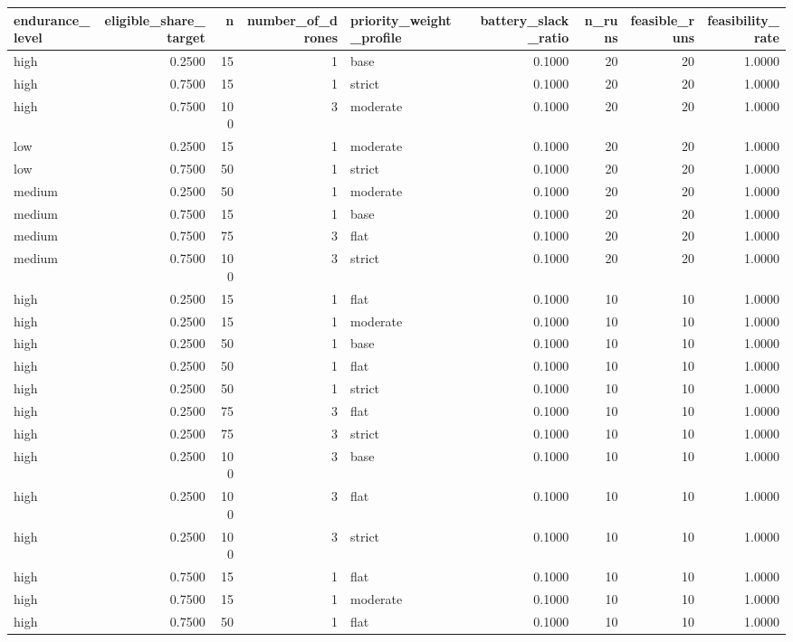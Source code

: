 \begin{tabular}{lrrrlrrrr}
\toprule
endurance_level & eligible_share_target & n & number_of_drones & priority_weight_profile & battery_slack_ratio & n_runs & feasible_runs & feasibility_rate \\
\midrule
high & 0.2500 & 15 & 1 & base & 0.1000 & 20 & 20 & 1.0000 \\
high & 0.7500 & 15 & 1 & strict & 0.1000 & 20 & 20 & 1.0000 \\
high & 0.7500 & 100 & 3 & moderate & 0.1000 & 20 & 20 & 1.0000 \\
low & 0.2500 & 15 & 1 & moderate & 0.1000 & 20 & 20 & 1.0000 \\
low & 0.7500 & 50 & 1 & strict & 0.1000 & 20 & 20 & 1.0000 \\
medium & 0.2500 & 50 & 1 & moderate & 0.1000 & 20 & 20 & 1.0000 \\
medium & 0.7500 & 15 & 1 & base & 0.1000 & 20 & 20 & 1.0000 \\
medium & 0.7500 & 75 & 3 & flat & 0.1000 & 20 & 20 & 1.0000 \\
medium & 0.7500 & 100 & 3 & strict & 0.1000 & 20 & 20 & 1.0000 \\
high & 0.2500 & 15 & 1 & flat & 0.1000 & 10 & 10 & 1.0000 \\
high & 0.2500 & 15 & 1 & moderate & 0.1000 & 10 & 10 & 1.0000 \\
high & 0.2500 & 50 & 1 & base & 0.1000 & 10 & 10 & 1.0000 \\
high & 0.2500 & 50 & 1 & flat & 0.1000 & 10 & 10 & 1.0000 \\
high & 0.2500 & 50 & 1 & strict & 0.1000 & 10 & 10 & 1.0000 \\
high & 0.2500 & 75 & 3 & flat & 0.1000 & 10 & 10 & 1.0000 \\
high & 0.2500 & 75 & 3 & strict & 0.1000 & 10 & 10 & 1.0000 \\
high & 0.2500 & 100 & 3 & base & 0.1000 & 10 & 10 & 1.0000 \\
high & 0.2500 & 100 & 3 & flat & 0.1000 & 10 & 10 & 1.0000 \\
high & 0.2500 & 100 & 3 & strict & 0.1000 & 10 & 10 & 1.0000 \\
high & 0.7500 & 15 & 1 & flat & 0.1000 & 10 & 10 & 1.0000 \\
high & 0.7500 & 15 & 1 & moderate & 0.1000 & 10 & 10 & 1.0000 \\
high & 0.7500 & 50 & 1 & flat & 0.1000 & 10 & 10 & 1.0000 \\

\end{tabular}
